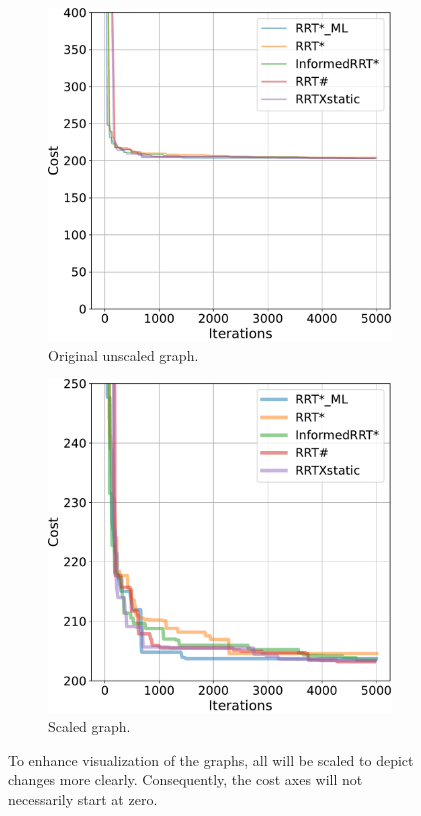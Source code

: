 \documentclass{ctuthesis}
\begin{document}
\begin{figure}[!ht]
  \centering 
  \begin{subfigure}[b]{0.49\textwidth}
    \includegraphics[width=\textwidth]{figChap5/graph_U_20pt_ticks_big.pdf}
    \caption{Original unscaled graph.}
  \end{subfigure}  
  \begin{subfigure}[b]{0.49\textwidth}
    \includegraphics[width=\textwidth]{figChap5/graph_U_20pt_ticks.pdf}  
    \caption{Scaled graph.}
  \end{subfigure} 
  \caption{To enhance visualization of the graphs, all will be scaled to depict changes more clearly. 
  Consequently, the cost axes will not necessarily start at zero.}
  \label{fig:graph_scale}
\end{figure}
\end{document}
